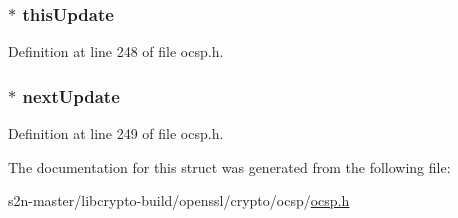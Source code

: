 \subsubsection[{\texorpdfstring{this\+Update}{thisUpdate}}]{ $\ast$ this\+Update}\hypertarget{structocsp__single__response__st_a3aca1acb2b48dcfe60087e3663e07925}{}\label{structocsp__single__response__st_a3aca1acb2b48dcfe60087e3663e07925}


Definition at line 248 of file ocsp.\+h.

\subsubsection[{\texorpdfstring{next\+Update}{nextUpdate}}]{ $\ast$ next\+Update}\hypertarget{structocsp__single__response__st_a6d185df491a6cd3928f96ba3e2512360}{}\label{structocsp__single__response__st_a6d185df491a6cd3928f96ba3e2512360}


Definition at line 249 of file ocsp.\+h.



The documentation for this struct was generated from the following file\+:\begin{DoxyCompactItemize}
\item 
s2n-\/master/libcrypto-\/build/openssl/crypto/ocsp/\hyperlink{crypto_2ocsp_2ocsp_8h}{ocsp.\+h}\end{DoxyCompactItemize}
